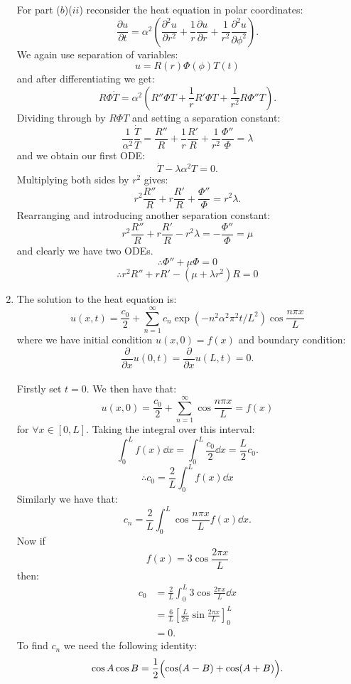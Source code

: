 \begin{enumerate}
    \newpage

    For part ($b$)($ii$) reconsider the heat equation
    in polar coordinates:
    $$\frac{\partial u}{\partial t}=\alpha^2\left(\frac{\partial^2 u}{\partial r^2}
    +\frac{1}{r}\frac{\partial u}{\partial r}
    +\frac{1}{r^2}\frac{\partial^2 u}{\partial \phi^2}\right).$$
    We again use separation of variables:
    $$u=R(r)\Phi(\phi)T(t)$$
    and after differentiating we get:
    $$R\Phi\dot{T}=\alpha^2\left(R''\Phi T+\frac{1}{r}R'\Phi T
    +\frac{1}{r^2}R\Phi''T\right).$$
    Dividing through by $R\Phi T$ and setting a separation constant:
    $$\frac{1}{\alpha^2}\frac{\dot{T}}{T}=\frac{R''}{R}+\frac{1}{r}\frac{R'}{R}
    +\frac{1}{r^2}\frac{\Phi''}{\Phi}=\lambda$$
    and we obtain our first ODE:
    $$\dot{T}-\lambda\alpha^2 T=0.$$
    Multiplying both sides by $r^2$ gives:
    $$r^2\frac{R''}{R}+r\frac{R'}{R}
    +\frac{\Phi''}{\Phi}=r^2\lambda.$$
    Rearranging and introducing another separation constant:
    $$r^2\frac{R''}{R}+r\frac{R'}{R}-r^2\lambda
    =-\frac{\Phi''}{\Phi}=\mu$$
    and clearly we have two ODEs.
    $$\therefore\Phi''+\mu\Phi=0$$
    $$\therefore r^2 R''+rR'
    -(\mu+\lambda r^2)R=0$$

    \newpage

    \item The solution to the heat equation is:
    $$u(x,t)=\frac{c_0}{2}+\sum_{n=1}^{\infty}c_n
    \exp\left(-n^2\alpha^2\pi^2 t/L^2\right)\cos\frac{n\pi x}{L}$$
    where we have initial condition $u(x,0)=f(x)$ and boundary condition:
    $$\frac{\partial}{\partial x}u(0,t)=\frac{\partial}{\partial x}u(L,t)=0.$$ \\

    Firstly set $t=0$. We then have that:
    $$u(x,0)=\frac{c_0}{2}+\sum_{n=1}^{\infty}\cos\frac{n\pi x}{L}=f(x)$$
    for $\forall x\in[0,L]$. Taking the integral over this interval:
    $$\int_{0}^{L}f(x)\dd x=\int_{0}^{L}\frac{c_0}{2}\dd x=\frac{L}{2}c_0.$$
    $$\therefore c_0=\frac{2}{L}\int_{0}^{L}f(x)\dd x$$
    Similarly we have that:
    $$c_n=\frac{2}{L}\int_{0}^{L}\cos\frac{n\pi x}{L}f(x)\dd x.$$
    Now if
    $$f(x)=3\cos\frac{2\pi x}{L}$$
    then:
    \begin{align*}
        c_0
        &=\frac{2}{L}\int_{0}^{L}3\cos\frac{2\pi x}{L}\dd x \\
        &=\frac{6}{L}\left[\frac{L}{2\pi}
        \sin\frac{2\pi x}{L}\right]_{0}^{L} \\
        &=0.
    \end{align*}
    To find $c_n$ we need the following identity:
    $$\cos A\cos B=\frac{1}{2}\Bigl(\cos(A-B)+\cos(A+B)\Bigl).$$


\end{enumerate}

